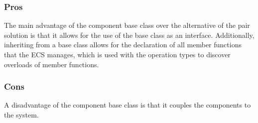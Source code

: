 \subsubsection{Pros}
The main advantage of the component base class over the alternative of the pair solution is that it allows for the use of the base class as an interface.
Additionally, inheriting from a base class allows for the declaration of all member functions that the ECS manages, which is used with the operation types to discover overloads of member functions.

\subsubsection{Cons}
A disadvantage of the component base class is that it couples the components to the system.
